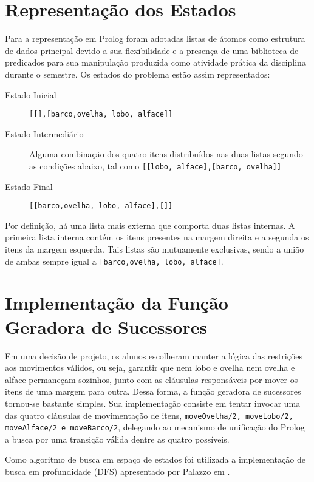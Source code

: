 \documentclass[brazil,times]{abnt}
\begin{document}
\section*{Representação dos Estados}
	Para a representação em Prolog foram adotadas listas de átomos como
	estrutura de dados principal devido a sua flexibilidade e a presença de uma
	biblioteca de predicados para sua manipulação produzida como atividade
	prática da disciplina durante o semestre. Os estados do problema estão assim
	representados:
	
	\begin{description}
		\item[Estado Inicial] \texttt{[[],[barco,ovelha, lobo, alface]]}
		\item[Estado Intermediário] Alguma combinação dos quatro itens distribuídos
		nas duas listas segundo as condições abaixo, tal como \texttt{[[lobo,
		alface],[barco, ovelha]]}
		\item[Estado Final] \texttt{[[barco,ovelha, lobo, alface],[]]}
	\end{description}

	Por definição, há uma lista mais externa que comporta duas listas internas. A
	primeira lista interna contém os itens presentes na margem direita e a segunda
	os itens da margem esquerda. Tais listas são mutuamente exclusivas, sendo a
	união de ambas sempre igual a \texttt{[barco,ovelha, lobo, alface]}.
	
	
\section*{Implementação da Função Geradora de Sucessores}
	Em uma decisão de projeto, os alunos escolheram manter a lógica das restrições
	aos movimentos válidos, ou seja, garantir que nem lobo e ovelha nem ovelha e
	alface permaneçam sozinhos, junto com as cláusulas responsáveis por mover os itens de
	uma margem para outra. Dessa forma, a função geradora de sucessores tornou-se
	bastante simples. Sua implementação consiste em tentar invocar uma das quatro
	cláusulas de movimentação de itens, \texttt{moveOvelha/2, moveLobo/2,
	moveAlface/2 e moveBarco/2}, delegando ao mecanismo de unificação do Prolog a
	busca por uma transição válida dentre as quatro possíveis.
	
	Como algoritmo de busca em espaço de estados foi utilizada a implementação de
	busca em profundidade (DFS) apresentado por Palazzo em
	\cite{palazzo:introducao-prolog}.
		
\end{document}
